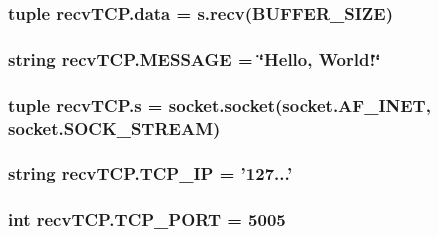 \subsubsection[{data}]{\setlength{\rightskip}{0pt plus 5cm}tuple recv\+T\+C\+P.\+data = s.\+recv({\bf B\+U\+F\+F\+E\+R\+\_\+\+S\+I\+Z\+E})}\label{namespacerecvTCP_a29405b8c214c90736842cb457dad5d51}
\hypertarget{namespacerecvTCP_a4b1a41c5ae1629d9645ff3932c444fb8}{}
\subsubsection[{M\+E\+S\+S\+A\+G\+E}]{\setlength{\rightskip}{0pt plus 5cm}string recv\+T\+C\+P.\+M\+E\+S\+S\+A\+G\+E = \char`\"{}Hello, World!\char`\"{}}\label{namespacerecvTCP_a4b1a41c5ae1629d9645ff3932c444fb8}
\hypertarget{namespacerecvTCP_a3f01302de230c87561ea7d067e8a6243}{}
\subsubsection[{s}]{\setlength{\rightskip}{0pt plus 5cm}tuple recv\+T\+C\+P.\+s = socket.\+socket(socket.\+A\+F\+\_\+\+I\+N\+E\+T, socket.\+S\+O\+C\+K\+\_\+\+S\+T\+R\+E\+A\+M)}\label{namespacerecvTCP_a3f01302de230c87561ea7d067e8a6243}
\hypertarget{namespacerecvTCP_aa05e3ee6e3ba40a6130d0ee057f07106}{}
\subsubsection[{T\+C\+P\+\_\+\+I\+P}]{\setlength{\rightskip}{0pt plus 5cm}string recv\+T\+C\+P.\+T\+C\+P\+\_\+\+I\+P = '127...'}\label{namespacerecvTCP_aa05e3ee6e3ba40a6130d0ee057f07106}
\hypertarget{namespacerecvTCP_a567a4b8a1978b161e49e7b5f6bc860ac}{}
\subsubsection[{T\+C\+P\+\_\+\+P\+O\+R\+T}]{\setlength{\rightskip}{0pt plus 5cm}int recv\+T\+C\+P.\+T\+C\+P\+\_\+\+P\+O\+R\+T = 5005}\label{namespacerecvTCP_a567a4b8a1978b161e49e7b5f6bc860ac}
